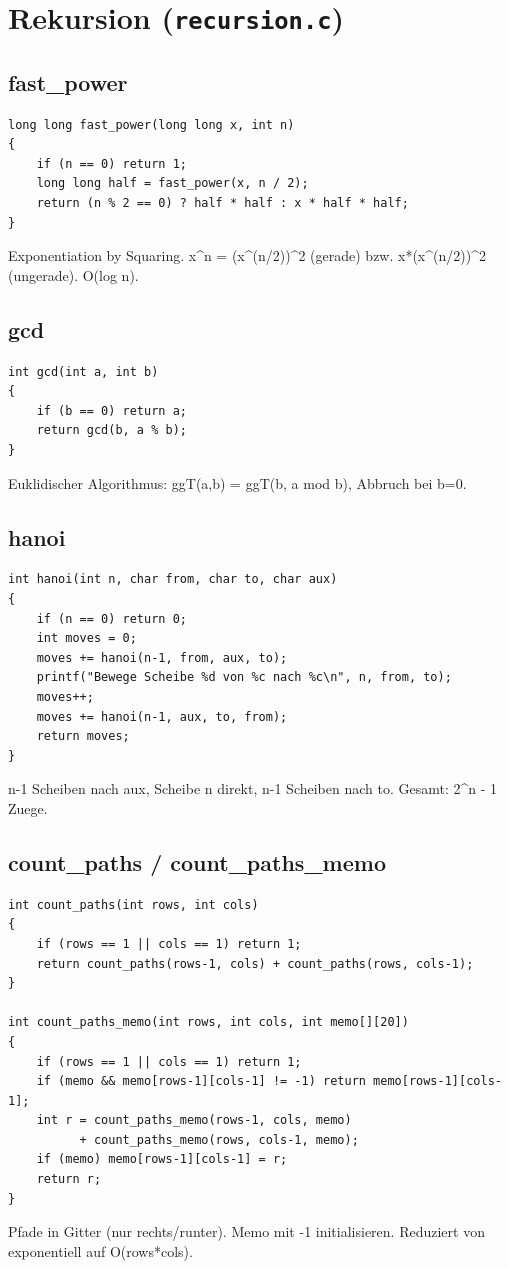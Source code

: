 \documentclass[10pt, a4paper]{article}
\begin{document}
\section{Rekursion (\texttt{recursion.c})}

\subsection{fast\_power}
\begin{lstlisting}
long long fast_power(long long x, int n)
{
    if (n == 0) return 1;
    long long half = fast_power(x, n / 2);
    return (n % 2 == 0) ? half * half : x * half * half;
}
\end{lstlisting}
Exponentiation by Squaring. x\^{}n = (x\^{}(n/2))\^{}2 (gerade) bzw. x*(x\^{}(n/2))\^{}2 (ungerade). O(log n).

\subsection{gcd}
\begin{lstlisting}
int gcd(int a, int b)
{
    if (b == 0) return a;
    return gcd(b, a % b);
}
\end{lstlisting}
Euklidischer Algorithmus: ggT(a,b) = ggT(b, a mod b), Abbruch bei b=0.

\subsection{hanoi}
\begin{lstlisting}
int hanoi(int n, char from, char to, char aux)
{
    if (n == 0) return 0;
    int moves = 0;
    moves += hanoi(n-1, from, aux, to);
    printf("Bewege Scheibe %d von %c nach %c\n", n, from, to);
    moves++;
    moves += hanoi(n-1, aux, to, from);
    return moves;
}
\end{lstlisting}
n-1 Scheiben nach aux, Scheibe n direkt, n-1 Scheiben nach to. Gesamt: 2\^{}n - 1 Zuege.

\subsection{count\_paths / count\_paths\_memo}
\begin{lstlisting}
int count_paths(int rows, int cols)
{
    if (rows == 1 || cols == 1) return 1;
    return count_paths(rows-1, cols) + count_paths(rows, cols-1);
}

int count_paths_memo(int rows, int cols, int memo[][20])
{
    if (rows == 1 || cols == 1) return 1;
    if (memo && memo[rows-1][cols-1] != -1) return memo[rows-1][cols-1];
    int r = count_paths_memo(rows-1, cols, memo)
          + count_paths_memo(rows, cols-1, memo);
    if (memo) memo[rows-1][cols-1] = r;
    return r;
}
\end{lstlisting}
Pfade in Gitter (nur rechts/runter). Memo mit -1 initialisieren. Reduziert von exponentiell auf O(rows*cols).
\end{document}
